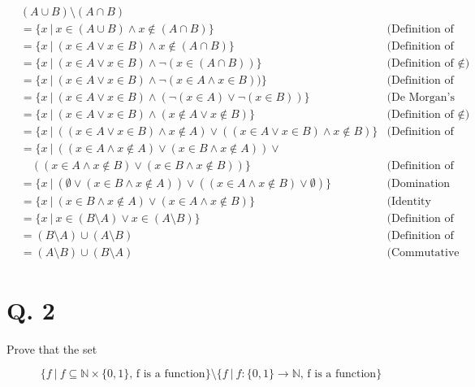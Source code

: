\documentclass[11pt]{article}
\begin{document}
\begin{align*}
    &(A \cup B) \setminus (A \cap B)\\
    &= \{ x\ |\ x \in (A \cup B) \land x \notin (A \cap B) \} &\text{(Definition of difference)}\\
    &= \{ x\ |\ (x \in A \lor x \in B) \land x \notin (A \cap B) \} &\text{(Definition of Union)}\\
    &= \{ x\ |\ (x \in A \lor x \in B) \land \neg (x \in (A \cap B)) \} & \text{(Definition\ of\ $\notin$)}\\
    &= \{ x\ |\ (x \in A \lor x \in B) \land \neg (x \in A \land x \in B)) \} & \text{(Definition\ of\ Intersection)}\\
    &= \{ x\ |\ (x \in A \lor x \in B) \land (\neg (x \in A) \lor \neg (x \in B)) \} & \text{(De Morgan's for Logical Rules)}\\
    &= \{ x\ |\ (x \in A \lor x \in B) \land (x \notin A \lor x \notin B) \} & \text{(Definition of $\notin$)}\\
    &= \{ x\ |\ ((x \in A \lor x \in B) \land x \notin A) \lor ((x \in A \lor x \in B) \land x \notin B) \} & \text{(Definition of Distributive Law)}\\
    &= \{ x\ |\ ((x \in A \land x \notin A) \lor (x \in B \land x \notin A)) \lor \\ 
    &\quad((x \in A \land x \notin B) \lor (x \in B \land x \notin B)) \} & \text{(Definition of Distributive Law)}\\
    &= \{ x\ |\ (\emptyset \lor (x \in B \land x \notin A)) \lor ((x \in A \land x \notin B) \lor \emptyset)\} &\text{(Domination Law)}\\
    &= \{ x\ |\ (x \in B \land x \notin A) \lor (x \in A \land x \notin B)\} &\text{(Identity Law)}\\
    &= \{ x\ |\ x \in (B \setminus A) \lor x \in (A \setminus B)\} &\text{(Definition of difference)}\\
    &= (B \setminus A) \cup (A \setminus B) &\text{(Definition of Union)}\\
    &= (A \setminus B) \cup (B \setminus A) &\text{(Commutative Law)}
\end{align*}

\newpage

\section*{Q. 2}
Prove that the set

\begin{equation*}
    \{f\ |\ f \subseteq \mathbb{N} \times \{0, 1\} \text{, f is a function}\} \setminus \{f\ |\ f : \{0, 1\} \rightarrow \mathbb{N} \text{, f is a function}\}
\end{equation*}
\end{document}
